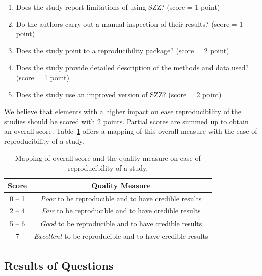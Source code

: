 \documentclass[a4paper, 12pt]{book}
\begin{document}
\begin{enumerate}
 \item Does the study report limitations of using SZZ? (score = 1 point)
 \item Do the authors carry out a manual inspection of their results? (score = 1 point)
 \item Does the study point to a reproducibility package? (score = 2 point)
 \item Does the study provide detailed description of the methods and data used? (score = 1 point)
 \item Does the study use an improved version of SZZ? (score = 2 point)
\end{enumerate}

We believe that elements with a higher impact on ease reproducibility of the studies should be scored with 2 points. Partial scores are summed up to obtain an overall score. Table~\ref{tableScore} offers a mapping of this overall measure with the ease of reproducibility of a study.
\begin{table}[!t]
\renewcommand{\arraystretch}{0.8}
\caption{Mapping of overall score and the quality measure on ease of reproducibility of a study.}
\label{tableScore}
\centering
\begin{tabular}{|c|c|}
\hline
Score & Quality Measure \\
\hline
\hline
 0 -- 1 & \emph{Poor} to be reproducible and to have credible results  \\
\hline
 2 -- 4 & \emph{Fair} to be reproducible and to have credible results  \\
\hline
 5 -- 6 & \emph{Good} to be reproducible and to have credible results  \\
\hline
 7 & \emph{Excellent} to be reproducible and to have credible results \\
\hline
\end{tabular}
\end{table}


\subsection{Results of Questions}
\label{subsec:results}
\end{document}
